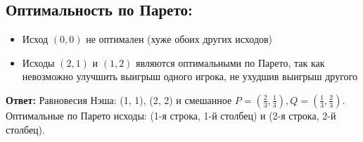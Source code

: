 \documentclass[a4paper,12pt]{article}
\begin{document}
\subsection*{Оптимальность по Парето:}
\begin{itemize}
    \item Исход $(0, 0)$ не оптимален (хуже обоих других исходов)
    \item Исходы $(2, 1)$ и $(1, 2)$ являются оптимальными по Парето, так как невозможно улучшить выигрыш одного игрока, не ухудшив выигрыш другого
\end{itemize}

\textbf{Ответ:} 
Равновесия Нэша: (1, 1), (2, 2) и смешанное $P=(\frac{2}{3}, \frac{1}{3}), Q=(\frac{1}{3}, \frac{2}{3})$.
Оптимальные по Парето исходы: (1-я строка, 1-й столбец) и (2-я строка, 2-й столбец).
\end{document}
